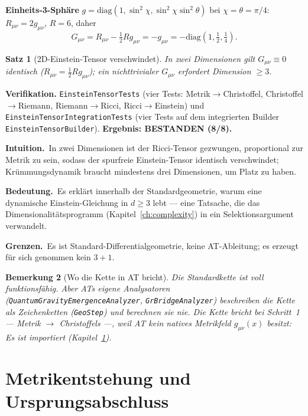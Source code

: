 \documentclass[10pt,twoside,openany]{book}
\newtheorem{theorem}{Satz}[chapter]
\newtheorem{remark}[theorem]{Bemerkung}
\newcommand{\theoremnotes}[3]{%
  \par\medskip\noindent
  \textbf{Intuition.}\ #1\par
  \textbf{Bedeutung.}\ #2\par
  \textbf{Grenzen.}\ #3\par}
\begin{document}
\textbf{Einheits-3-Sphäre} $g=\mathrm{diag}(1,\sin^2\chi,\sin^2\chi\sin^2\theta)$ bei
$\chi=\theta=\pi/4$: $R_{\mu\nu}=2g_{\mu\nu}$, $R=6$, daher
\begin{equation}
G_{\mu\nu} = R_{\mu\nu} - \tfrac12 R g_{\mu\nu} = -g_{\mu\nu}
= -\mathrm{diag}(1,\tfrac12,\tfrac14).
\end{equation}

\begin{theorem}[2D-Einstein-Tensor verschwindet]
In zwei Dimensionen gilt $G_{\mu\nu}\equiv0$ identisch
($R_{\mu\nu}=\tfrac12 R g_{\mu\nu}$); ein nichttrivialer $G_{\mu\nu}$ erfordert Dimension
$\ge3$.
\end{theorem}

\textbf{Verifikation.} \texttt{EinsteinTensorTests} (vier Tests:
Metrik$\to$Christoffel, Christoffel$\to$Riemann, Riemann$\to$Ricci,
Ricci$\to$Einstein) und \texttt{EinsteinTensorIntegrationTests} (vier Tests auf dem
integrierten Builder \texttt{EinsteinTensorBuilder}). \textbf{Ergebnis: BESTANDEN (8/8).}

\theoremnotes
{In zwei Dimensionen ist der Ricci-Tensor gezwungen, proportional zur Metrik zu sein,
sodass der spurfreie Einstein-Tensor identisch verschwindet; Krümmungsdynamik braucht
mindestens drei Dimensionen, um Platz zu haben.}
{Es erklärt innerhalb der Standardgeometrie, warum eine dynamische Einstein-Gleichung in
$d\ge3$ lebt --- eine Tatsache, die das Dimensionalitätsprogramm
(Kapitel~\ref{ch:complexity}) in ein Selektionsargument verwandelt.}
{Es ist Standard-Differentialgeometrie, keine AT-Ableitung; es erzeugt für sich genommen
kein $3{+}1$.}

\begin{remark}[Wo die Kette in AT bricht]
Die Standardkette ist voll funktionsfähig. Aber ATs eigene Analysatoren
(\texttt{QuantumGravityEmergenceAnalyzer}, \texttt{GrBridgeAnalyzer}) \emph{beschreiben}
die Kette als Zeichenketten (\texttt{GeoStep}) und \emph{berechnen} sie nie. Die Kette
bricht bei Schritt~1 — \emph{Metrik} $\to$ \emph{Christoffels} —, weil AT kein natives
Metrikfeld $g_{\mu\nu}(x)$ besitzt: Es ist importiert
(Kapitel~\ref{ch:metric-emergence}).
\end{remark}


\chapter{Metrikentstehung und Ursprungsabschluss}
\label{ch:metric-emergence}
\end{document}
